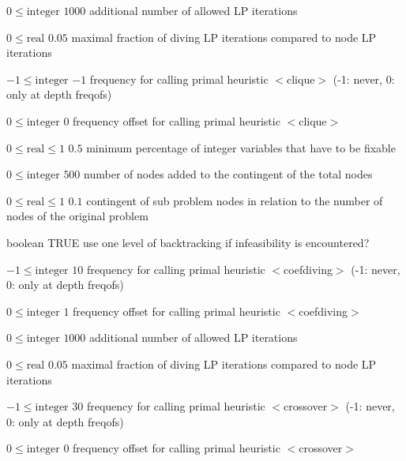 %
{$0\leq\textrm{integer}$}%
{$1000$}%
{additional number of allowed LP iterations}%
{}

%
{$0\leq\textrm{real}$}%
{$0.05$}%
{maximal fraction of diving LP iterations compared to node LP iterations}%
{}

%
{$-1\leq\textrm{integer}$}%
{$-1$}%
{frequency for calling primal heuristic $<$clique$>$ (-1: never, 0: only at depth freqofs)}%
{}

%
{$0\leq\textrm{integer}$}%
{$0$}%
{frequency offset for calling primal heuristic $<$clique$>$}%
{}

%
{$0\leq\textrm{real}\leq1$}%
{$0.5$}%
{minimum percentage of integer variables that have to be fixable}%
{}

%
{$0\leq\textrm{integer}$}%
{$500$}%
{number of nodes added to the contingent of the total nodes}%
{}

%
{$0\leq\textrm{real}\leq1$}%
{$0.1$}%
{contingent of sub problem nodes in relation to the number of nodes of the original problem}%
{}

%
{boolean}%
{TRUE}%
{use one level of backtracking if infeasibility is encountered?}%
{}

%
{$-1\leq\textrm{integer}$}%
{$10$}%
{frequency for calling primal heuristic $<$coefdiving$>$ (-1: never, 0: only at depth freqofs)}%
{}

%
{$0\leq\textrm{integer}$}%
{$1$}%
{frequency offset for calling primal heuristic $<$coefdiving$>$}%
{}

%
{$0\leq\textrm{integer}$}%
{$1000$}%
{additional number of allowed LP iterations}%
{}

%
{$0\leq\textrm{real}$}%
{$0.05$}%
{maximal fraction of diving LP iterations compared to node LP iterations}%
{}

%
{$-1\leq\textrm{integer}$}%
{$30$}%
{frequency for calling primal heuristic $<$crossover$>$ (-1: never, 0: only at depth freqofs)}%
{}

%
{$0\leq\textrm{integer}$}%
{$0$}%
{frequency offset for calling primal heuristic $<$crossover$>$}%
{}

